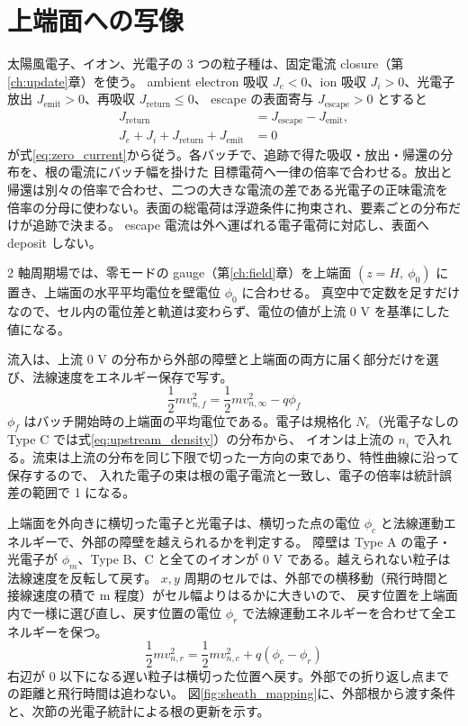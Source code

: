 \section{上端面への写像}
太陽風電子、イオン、光電子の 3 つの粒子種は、固定電流 closure（第\ref{ch:update}章）を使う。
ambient electron 吸収 $J_e<0$、ion 吸収 $J_i>0$、光電子放出 $J_{\mathrm{emit}}>0$、再吸収 $J_{\mathrm{return}}\le0$、
escape の表面寄与 $J_{\mathrm{escape}}>0$ とすると
\begin{align}
 J_{\mathrm{return}}&=J_{\mathrm{escape}}-J_{\mathrm{emit}},\\
 J_e+J_i+J_{\mathrm{return}}+J_{\mathrm{emit}}&=0
 \label{eq:stationary_budget}
\end{align}
が式\eqref{eq:zero_current}から従う。各バッチで、追跡で得た吸収・放出・帰還の分布を、根の電流にバッチ幅を掛けた
目標電荷へ一律の倍率で合わせる。放出と帰還は別々の倍率で合わせ、二つの大きな電流の差である光電子の正味電流を
倍率の分母に使わない。表面の総電荷は浮遊条件に拘束され、要素ごとの分布だけが追跡で決まる。
escape 電流は外へ運ばれる電子電荷に対応し、表面へ deposit しない。

2 軸周期場では、零モードの gauge（第\ref{ch:field}章）を上端面 $(z=H,\ \phi_0)$ に置き、上端面の水平平均電位を壁電位 $\phi_0$ に合わせる。
真空中で定数を足すだけなので、セル内の電位差と軌道は変わらず、電位の値が上流 0 V を基準にした値になる。

流入は、上流 0 V の分布から外部の障壁と上端面の両方に届く部分だけを選び、法線速度をエネルギー保存で写す。
\begin{equation}
 \frac12 m v_{n,f}^2=\frac12 m v_{n,\infty}^2-q\phi_f
 \label{eq:inflow_map}
\end{equation}
$\phi_f$ はバッチ開始時の上端面の平均電位である。電子は規格化 $N_e$（光電子なしの Type C では式\eqref{eq:upstream_density}）の分布から、
イオンは上流の $n_i$ で入れる。流束は上流の分布を同じ下限で切った一方向の束であり、特性曲線に沿って保存するので、
入れた電子の束は根の電子電流と一致し、電子の倍率は統計誤差の範囲で 1 になる。

上端面を外向きに横切った電子と光電子は、横切った点の電位 $\phi_c$ と法線運動エネルギーで、外部の障壁を越えられるかを判定する。
障壁は Type A の電子・光電子が $\phi_m$、Type B、C と全てのイオンが 0 V である。越えられない粒子は法線速度を反転して戻す。
$x,y$ 周期のセルでは、外部での横移動（飛行時間と接線速度の積で m 程度）がセル幅よりはるかに大きいので、
戻す位置を上端面内で一様に選び直し、戻す位置の電位 $\phi_r$ で法線運動エネルギーを合わせて全エネルギーを保つ。
\begin{equation}
 \frac12 m v_{n,r}^2=\frac12 m v_{n,c}^2+q(\phi_c-\phi_r)
 \label{eq:return_map}
\end{equation}
右辺が 0 以下になる遅い粒子は横切った位置へ戻す。外部での折り返し点までの距離と飛行時間は追わない。
図\ref{fig:sheath_mapping}に、外部根から渡す条件と、次節の光電子統計による根の更新を示す。



